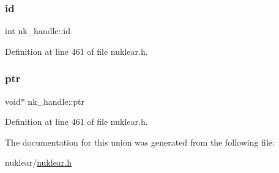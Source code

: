 \subsubsection{\texorpdfstring{id}{id}}
{\footnotesize\ttfamily int nk\+\_\+handle\+::id}



Definition at line 461 of file nuklear.\+h.

\mbox{\label{unionnk__handle_adbdcd879ad5f3d6cc77b5085bf35ac40}} 
\subsubsection{\texorpdfstring{ptr}{ptr}}
{\footnotesize\ttfamily void$\ast$ nk\+\_\+handle\+::ptr}



Definition at line 461 of file nuklear.\+h.



The documentation for this union was generated from the following file\+:\begin{DoxyCompactItemize}
\item 
nuklear/\mbox{\hyperlink{nuklear_8h}{nuklear.\+h}}\end{DoxyCompactItemize}
